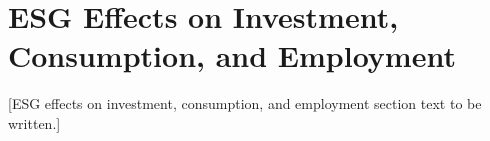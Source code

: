 
\section{ESG Effects on Investment, Consumption, and Employment}
\label{sec:investment}


[ESG effects on investment, consumption, and employment section text to be written.]
